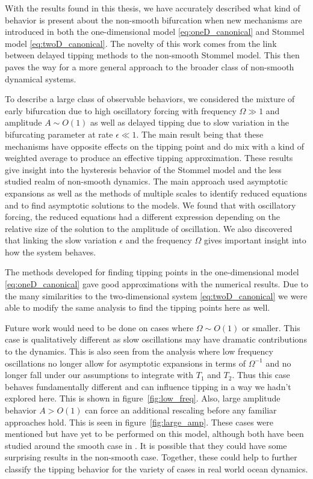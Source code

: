 With the results found in this thesis, we have accurately described what kind of behavior is present about the non-smooth bifurcation when new mechanisms are introduced in both the one-dimensional model \eqref{eq:oneD_canonical} and Stommel model \eqref{eq:twoD_canonical}. The novelty of this work comes from the link between delayed tipping methods to the non-smooth Stommel model. This then paves the way for a more general approach to the broader class of non-smooth dynamical systems.

To describe a large class of observable behaviors, we considered the mixture of early bifurcation due to high oscillatory forcing with frequency $\Omega\gg 1$ and amplitude $A\sim O(1)$ as well as delayed tipping due to slow variation in the bifurcating parameter at rate $\epsilon\ll 1$. The main result being that these mechanisms have opposite effects on the tipping point and do mix with a kind of weighted average to produce an effective tipping approximation. These results give insight into the hysteresis behavior of the Stommel model and the less studied realm of non-smooth dynamics. The main approach used asymptotic expansions as well as the methods of multiple scales to identify reduced equations and to find asymptotic solutions to the models. We found that with oscillatory forcing, the reduced equations had a different expression depending on the relative size of the solution to the amplitude of oscillation. We also discovered that linking the slow variation $\epsilon$ and the frequency $\Omega$ gives important insight into how the system behaves. 

The methods developed for finding tipping points in the one-dimensional model \eqref{eq:oneD_canonical} gave good approximations with the numerical results. Due to the many similarities to the two-dimensional system \eqref{eq:twoD_canonical} we were able to modify the same analysis to find the tipping points here as well.

Future work would need to be done on cases where $\Omega\sim O(1)$ or smaller. This case is qualitatively different as slow oscillations may have dramatic contributions to the dynamics. This is also seen from the analysis where low frequency oscillations no longer allow for asymptotic expansions in terms of $\Omega^{-1}$ and no longer fall under our assumptions to integrate with $T_1$ and $T_2$. Thus this case behaves fundamentally different and can influence tipping in a way we hadn't explored here. This is shown in figure~\ref{fig:low_freq}. Also, large amplitude behavior $A>O(1)$ can force an additional rescaling before any familiar approaches hold. This is seen in figure~\ref{fig:large_amp}. These cases were mentioned but have yet to be performed on this model, although both have been studied around the smooth case in \cite{zhu2015tipping}. It is possible that they could have some surprising results in the non-smooth case. Together, these could help to further classify the tipping behavior for the variety of cases in real world ocean dynamics.

